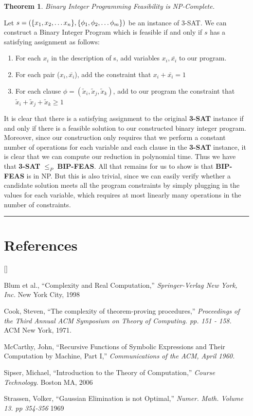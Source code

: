 \documentclass{article}
\newtheorem{theorem}{Theorem}[section]
\def\beginrefs{\begin{list}%
    {[\arabic{equation}]}{\usecounter{equation}
      \setlength{\leftmargin}{2.0truecm}\setlength{\labelsep}{0.4truecm}%
      \setlength{\labelwidth}{1.6truecm}}}
\def\endrefs{\end{list}}
\def\bibentry#1{\item[\hbox{[#1]}]}
\newenvironment{proof}{{\bf Proof:}}{\hfill\rule{2mm}{2mm}}
\begin{document}
\begin{theorem}
  Binary Integer Programming Feasibility is NP-Complete.
\end{theorem}

\begin{proof}

  Let $s = (\{x_1, x_2, \ldots x_n\}, \{\phi_1, \phi_2, \ldots
    \phi_m\})$ be an instance of 3-SAT.  We can construct a Binary
  Integer Program which is feasible if and only if $s$ has a satisfying
  assignment as follows:

\begin{enumerate}
\item For each $x_i$ in the description of s, add variables $x_i,
  \bar{x_i}$ to our program.
\item For each pair ($x_i, \bar{x_i}$), add the constraint that $x_i + \bar{x_i} = 1$
\item For each clause $\phi = (\tilde{x}_i, \tilde{x}_j,
  \tilde{x}_k)$, add to our program the constraint that $\tilde{x}_i +
  \tilde{x}_j + \tilde{x}_k \geq 1$
\end{enumerate}

It is clear that there is a satisfying assignment to the original
\textbf{3-SAT} instance if and only if there is a feasible solution to
our constructed binary integer program.  Moreover, since our
construction only requires that we perform a constant number of
operations for each variable and each clause in the \textbf{3-SAT}
instance, it is clear that we can compute our reduction in polynomial
time.  Thus we have that \textbf{3-SAT} $\leq_P$ \textbf{BIP-FEAS}.
All that remains for us to show is that \textbf{BIP-FEAS} is in NP.
But this is also trivial, since we can easily verify whether a
candidate solution meets all the program constraints by simply
plugging in the values for each variable, which requires at most
linearly many operations in the number of constraints.
\end{proof}

\newpage 
\section*{References}

\beginrefs

\bibentry{B98}{\sc Blum et al.},
``Complexity and Real Computation,''
{\it Springer-Verlag New York, Inc.}
New York City, 1998

\bibentry{C71}{\sc Cook, Steven}, ``The complexity of theorem-proving
procedures,'' {\it Proceedings of the Third Annual ACM Symposium on
  Theory of Computing. pp. 151 - 158.}  ACM New York, 1971.

\bibentry{M60}{\sc McCarthy, John},
``Recursive Functions of Symbolic Expressions
and Their Computation by Machine, Part I,''
{\it Communications of the ACM, April 1960.}

\bibentry{S06}{\sc Sipser, Michael},
``Introduction to the Theory of Computation,''
{\it Course Technology.}
Boston MA, 2006

\bibentry{S69}{\sc Strassen, Volker}, ``Gaussian Elimination is not
Optimal,'' {\it Numer. Math. Volume 13. pp 354-356} 1969
\endrefs
\end{document}
